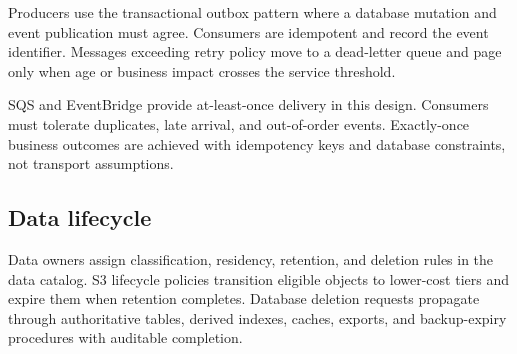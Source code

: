 Producers use the transactional outbox pattern where a database mutation and event publication must agree. Consumers are idempotent and record the event identifier. Messages exceeding retry policy move to a dead-letter queue and page only when age or business impact crosses the service threshold.

\begin{warningbox}
SQS and EventBridge provide at-least-once delivery in this design. Consumers must tolerate duplicates, late arrival, and out-of-order events. Exactly-once business outcomes are achieved with idempotency keys and database constraints, not transport assumptions.
\end{warningbox}

\subsection{Data lifecycle}

Data owners assign classification, residency, retention, and deletion rules in the data catalog. S3 lifecycle policies transition eligible objects to lower-cost tiers and expire them when retention completes. Database deletion requests propagate through authoritative tables, derived indexes, caches, exports, and backup-expiry procedures with auditable completion.

